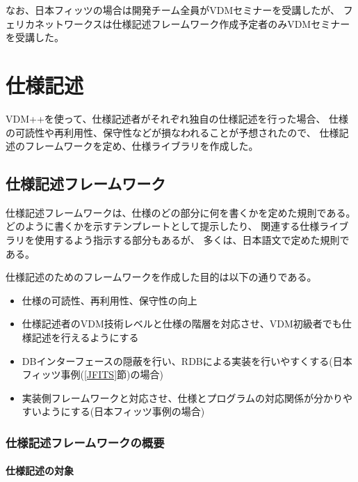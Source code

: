 なお、日本フィッツの場合は開発チーム全員がVDMセミナーを受講したが、
フェリカネットワークスは仕様記述フレームワーク作成予定者のみVDMセミナーを受講した。

\section{仕様記述}
	\label{Specification}

	VDM++を使って、仕様記述者がそれぞれ独自の仕様記述を行った場合、
	仕様の可読性や再利用性、保守性などが損なわれることが予想されたので、
	仕様記述のフレームワークを定め、仕様ライブラリを作成した。

\subsection{仕様記述フレームワーク}
	\label{SpecFramework}

仕様記述フレームワークは、仕様のどの部分に何を書くかを定めた規則である。
どのように書くかを示すテンプレートとして提示したり、
関連する仕様ライブラリを使用するよう指示する部分もあるが、
多くは、日本語文で定めた規則である。

仕様記述のためのフレームワークを作成した目的は以下の通りである。

	\begin{itemize}
	\item 仕様の可読性、再利用性、保守性の向上
	\item 仕様記述者のVDM技術レベルと仕様の階層を対応させ、VDM初級者でも仕様記述を行えるようにする
	\item DBインターフェースの隠蔽を行い、RDBによる実装を行いやすくする(日本フィッツ事例(\ref{JFITS}節)の場合)
	\item 実装側フレームワークと対応させ、仕様とプログラムの対応関係が分かりやすいようにする(日本フィッツ事例の場合)
	\end{itemize}

\subsubsection{仕様記述フレームワークの概要}

	\paragraph{仕様記述の対象}

